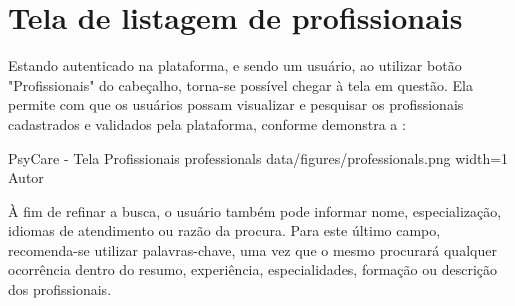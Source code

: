\section{Tela de listagem de profissionais}
\label{sec:profissionais}

Estando autenticado na plataforma, e sendo um usuário, ao utilizar botão "Profissionais" do cabeçalho, torna-se possível chegar à tela em questão. Ela permite com que os usuários possam visualizar e pesquisar os profissionais cadastrados e validados pela plataforma, conforme demonstra a :

\image
    {PsyCare - Tela Profissionais}
    {professionals}
    {data/figures/professionals.png}
    {width=1\textwidth}
    {Autor}

À fim de refinar a busca, o usuário também pode informar nome, especialização, idiomas de atendimento ou razão da procura. Para este último campo, recomenda-se utilizar palavras-chave, uma vez que o mesmo procurará qualquer ocorrência dentro do resumo, experiência, especialidades, formação ou descrição dos profissionais.
